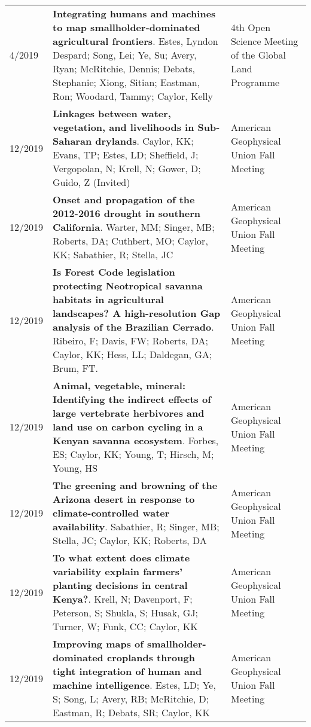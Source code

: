 \begin{longtable}{lp{10.0cm}p{4.5cm}}
4/2019 & {\bf Integrating humans and machines to map smallholder-dominated agricultural frontiers}. Estes, Lyndon Despard; Song, Lei; Ye, Su; Avery, Ryan; McRitchie, Dennis; Debats, Stephanie; Xiong, Sitian; Eastman, Ron; Woodard, Tammy; Caylor, Kelly  & 4th Open Science Meeting of the Global Land Programme \\
  
12/2019 & {\bf Linkages between water, vegetation, and livelihoods in Sub-Saharan drylands}. Caylor, KK; Evans, TP; Estes, LD; Sheffield, J; Vergopolan, N; Krell, N;  Gower, D; Guido, Z  (Invited)  & American Geophysical Union Fall Meeting \\
  
12/2019 & {\bf Onset and propagation of the 2012-2016 drought in southern California}. Warter, MM; Singer, MB; Roberts, DA; Cuthbert, MO; Caylor, KK; Sabathier, R; Stella, JC  & American Geophysical Union Fall Meeting \\
  
12/2019 & {\bf Is Forest Code legislation protecting Neotropical savanna habitats in agricultural landscapes? A high-resolution Gap analysis of the Brazilian Cerrado}. Ribeiro, F; Davis, FW; Roberts, DA; Caylor, KK; Hess, LL; Daldegan, GA; Brum, FT.   & American Geophysical Union Fall Meeting \\
  
12/2019 & {\bf Animal, vegetable, mineral: Identifying the indirect effects of large vertebrate herbivores and land use on carbon cycling in a Kenyan savanna ecosystem}. Forbes, ES; Caylor, KK; Young, T; Hirsch, M; Young, HS  & American Geophysical Union Fall Meeting \\
  
12/2019 & {\bf The greening and browning of the Arizona desert in response to climate-controlled water availability}. Sabathier, R; Singer, MB; Stella, JC; Caylor, KK; Roberts, DA  & American Geophysical Union Fall Meeting \\
  
12/2019 & {\bf To what extent does climate variability explain farmers' planting decisions in central Kenya?}. Krell, N; Davenport, F; Peterson, S; Shukla, S; Husak, GJ; Turner, W; Funk, CC; Caylor, KK  & American Geophysical Union Fall Meeting \\
  
12/2019 & {\bf Improving maps of smallholder-dominated croplands through tight integration of human and machine intelligence}. Estes, LD; Ye, S; Song, L; Avery, RB; McRitchie, D; Eastman, R; Debats, SR; Caylor, KK  & American Geophysical Union Fall Meeting \\
  

\end{longtable}
